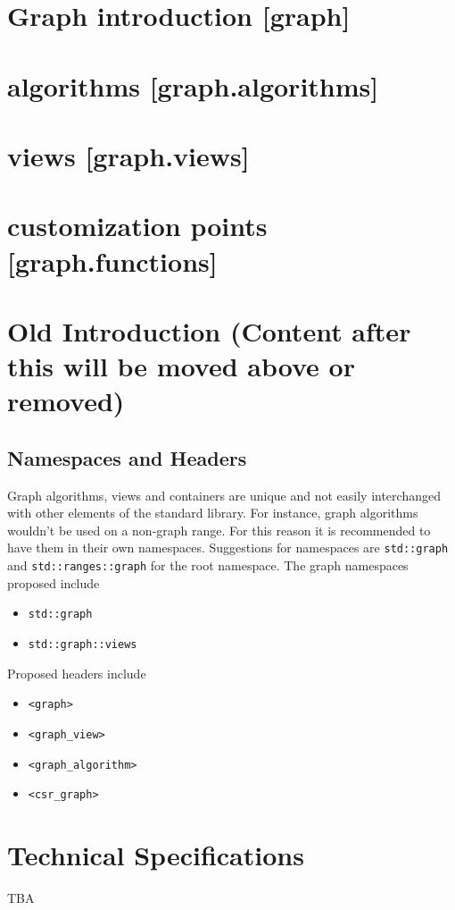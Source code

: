 \documentclass[10pt,onecolumn]{article}
\newcommand{\tcode}[1]{\lstinline[breaklines=true]{#1}}
\begin{document}
\section{Graph introduction [graph]}
\section{algorithms [graph.algorithms]}
\section{views [graph.views]}
\section{customization points [graph.functions]}


\section{Old Introduction (Content after this will be moved above or removed)}

\subsection{Namespaces and Headers}
Graph algorithms, views and containers are unique and not easily interchanged with other elements of the standard library. For
instance, graph algorithms wouldn't be used on a non-graph range. For this reason it is recommended to have them in their own 
namespaces. Suggestions for namespaces are \tcode{std::graph} and
\tcode{std::ranges::graph} for the root namespace. The graph namespaces proposed include
\begin{itemize}
\item[]\tcode{std::graph}
\item[]\tcode{std::graph::views}
\end{itemize}

Proposed headers include
\begin{itemize}
\item[]\tcode{<graph>}
\item[]\tcode{<graph_view>}
\item[]\tcode{<graph_algorithm>}
\item[]\tcode{<csr_graph>}
\end{itemize}

\section{Technical Specifications}
TBA
\end{document}
